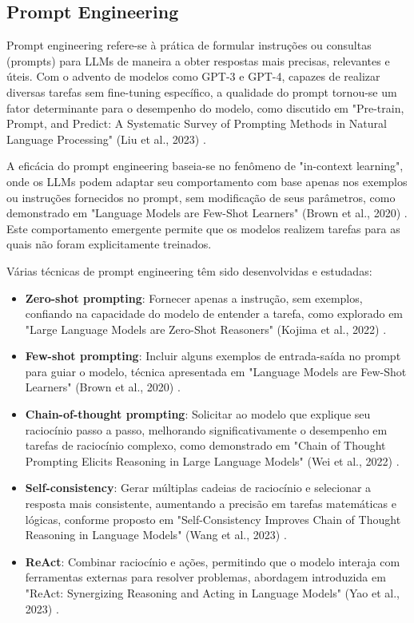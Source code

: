 \documentclass[tcc,capa]{texufpel}
\begin{document}
\subsection{Prompt Engineering}

Prompt engineering refere-se à prática de formular instruções ou consultas (prompts) para LLMs de maneira a obter respostas mais precisas, relevantes e úteis. Com o advento de modelos como GPT-3 e GPT-4, capazes de realizar diversas tarefas sem fine-tuning específico, a qualidade do prompt tornou-se um fator determinante para o desempenho do modelo, como discutido em "Pre-train, Prompt, and Predict: A Systematic Survey of Prompting Methods in Natural Language Processing" (Liu et al., 2023) \cite{liu2023pre}.

A eficácia do prompt engineering baseia-se no fenômeno de "in-context learning", onde os LLMs podem adaptar seu comportamento com base apenas nos exemplos ou instruções fornecidos no prompt, sem modificação de seus parâmetros, como demonstrado em "Language Models are Few-Shot Learners" (Brown et al., 2020) \cite{brown2020language}. Este comportamento emergente permite que os modelos realizem tarefas para as quais não foram explicitamente treinados.

Várias técnicas de prompt engineering têm sido desenvolvidas e estudadas:

\begin{itemize}
    \item \textbf{Zero-shot prompting}: Fornecer apenas a instrução, sem exemplos, confiando na capacidade do modelo de entender a tarefa, como explorado em "Large Language Models are Zero-Shot Reasoners" (Kojima et al., 2022) \cite{kojima2022large}.
    
    \item \textbf{Few-shot prompting}: Incluir alguns exemplos de entrada-saída no prompt para guiar o modelo, técnica apresentada em "Language Models are Few-Shot Learners" (Brown et al., 2020) \cite{brown2020language}.
    
    \item \textbf{Chain-of-thought prompting}: Solicitar ao modelo que explique seu raciocínio passo a passo, melhorando significativamente o desempenho em tarefas de raciocínio complexo, como demonstrado em "Chain of Thought Prompting Elicits Reasoning in Large Language Models" (Wei et al., 2022) \cite{wei2022chain}.
    
    \item \textbf{Self-consistency}: Gerar múltiplas cadeias de raciocínio e selecionar a resposta mais consistente, aumentando a precisão em tarefas matemáticas e lógicas, conforme proposto em "Self-Consistency Improves Chain of Thought Reasoning in Language Models" (Wang et al., 2023) \cite{wang2023self}.
    
    \item \textbf{ReAct}: Combinar raciocínio e ações, permitindo que o modelo interaja com ferramentas externas para resolver problemas, abordagem introduzida em "ReAct: Synergizing Reasoning and Acting in Language Models" (Yao et al., 2023) \cite{yao2023react}.
\end{itemize}
\end{document}
